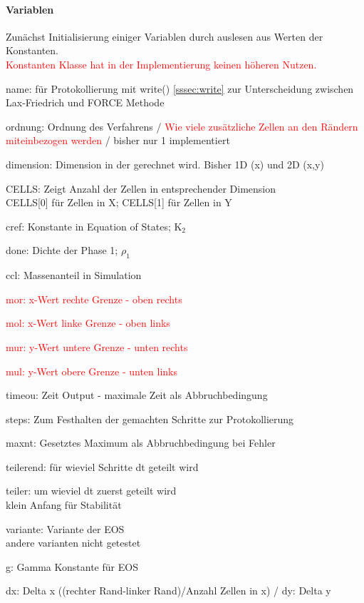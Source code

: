 \documentclass[12pt]{article}
\begin{document}
\paragraph{Variablen}
Zunächst Initialisierung einiger Variablen durch auslesen aus Werten der Konstanten.\\
\textcolor{red}{Konstanten Klasse hat in der Implementierung keinen höheren Nutzen.}
\begin{enumerate}
	\item name: für Protokollierung mit write() \ref{sssec:write} zur Unterscheidung zwischen Lax-Friedrich und FORCE Methode
	\item ordnung: Ordnung des Verfahrens / \textcolor{red}{Wie viele zusätzliche Zellen an den Rändern miteinbezogen werden} /  bisher nur 1 implementiert
	\item dimension: Dimension in der gerechnet wird. Bisher 1D (x) und 2D (x,y)
	\item CELLS: Zeigt Anzahl der Zellen in entsprechender Dimension\\
	CELLS[0] für Zellen in X; CELLS[1] für Zellen in Y
	\item cref: Konstante in Equation of States; K$_2$
	\item done: Dichte der Phase 1; $\rho_1$
	\item ccl: Massenanteil in Simulation
	\textcolor{red}{\item mor: x-Wert rechte Grenze - oben rechts
	\item mol: x-Wert linke Grenze - oben links
	\item mur: y-Wert untere Grenze - unten rechts
	\item mul: y-Wert obere Grenze - unten links}
	\item timeou: Zeit Output - maximale Zeit als Abbruchbedingung
	\item steps: Zum Festhalten der gemachten Schritte zur Protokollierung
	\item maxnt: Gesetztes Maximum als Abbruchbedingung bei Fehler
	\item teilerend: für wieviel Schritte dt geteilt wird
	\item teiler: um wieviel dt zuerst geteilt wird\\
	klein Anfang für Stabilität
	\item variante: Variante der EOS \\andere varianten nicht getestet
	\item g: Gamma Konstante für EOS
	\item dx: Delta x ((rechter Rand-linker Rand)/Anzahl Zellen in x) / dy: Delta y

\end{enumerate}
\end{document}
